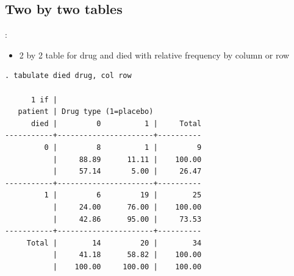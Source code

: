 \subsection{Two by two tables}
\begin{frame}[fragile]{\secname: \subsecname}
\begin{itemize}
\item 2 by 2 table for drug and died with relative frequency by column or row
\end{itemize}
\scriptsize
\begin{verbatim}
. tabulate died drug, col row

      1 if |
   patient | Drug type (1=placebo)
      died |         0          1 |     Total
-----------+----------------------+----------
         0 |         8          1 |         9 
           |     88.89      11.11 |    100.00 
           |     57.14       5.00 |     26.47 
-----------+----------------------+----------
         1 |         6         19 |        25 
           |     24.00      76.00 |    100.00 
           |     42.86      95.00 |     73.53 
-----------+----------------------+----------
     Total |        14         20 |        34 
           |     41.18      58.82 |    100.00 
           |    100.00     100.00 |    100.00 
	
\end{verbatim}
\end{frame}	

